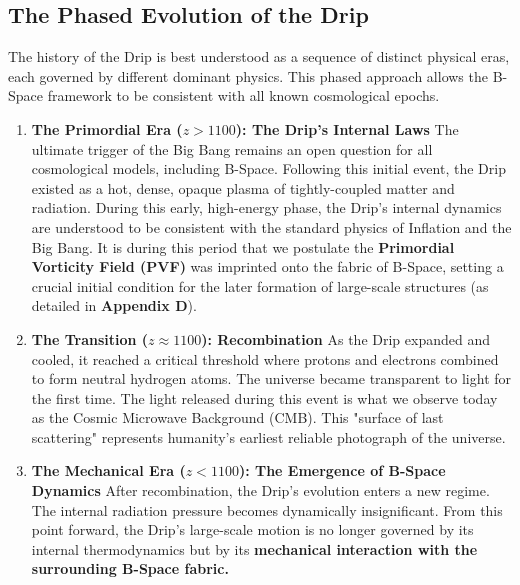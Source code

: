\documentclass{BSpacePaper} %
\begin{document}

\subsection{The Phased Evolution of the Drip}
The history of the Drip is best understood as a sequence of distinct physical eras, each governed by different dominant physics. This phased approach allows the B-Space framework to be consistent with all known cosmological epochs.
\begin{enumerate}
    \item \textbf{The Primordial Era ($z > 1100$): The Drip's Internal Laws}
The ultimate trigger of the Big Bang remains an open question for all cosmological models, including B-Space. Following this initial event, the Drip existed as a hot, dense, opaque plasma of tightly-coupled matter and radiation. During this early, high-energy phase, the Drip's internal dynamics are understood to be consistent with the standard physics of Inflation and the Big Bang. It is during this period that we postulate the \textbf{Primordial Vorticity Field (PVF)} was imprinted onto the fabric of B-Space, setting a crucial initial condition for the later formation of large-scale structures (as detailed in \textbf{Appendix D}).

 \item \textbf{The Transition ($z \approx 1100$): Recombination}
As the Drip expanded and cooled, it reached a critical threshold where protons and electrons combined to form neutral hydrogen atoms. The universe became transparent to light for the first time. The light released during this event is what we observe today as the Cosmic Microwave Background (CMB). This "surface of last scattering" represents humanity's earliest reliable photograph of the universe.

  \item \textbf{The Mechanical Era ($z < 1100$): The Emergence of B-Space Dynamics}
After recombination, the Drip's evolution enters a new regime. The internal radiation pressure becomes dynamically insignificant. From this point forward, the Drip's large-scale motion is no longer governed by its internal thermodynamics but by its \textbf{mechanical interaction with the surrounding B-Space fabric.}

\end{enumerate}    
\end{document}
